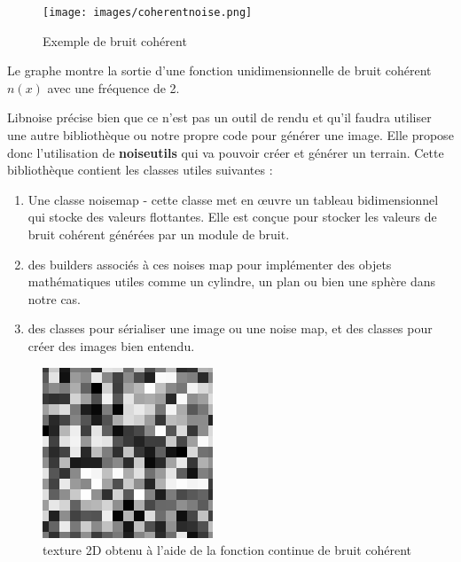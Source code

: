 \documentclass[12pt]{report}
\begin{document}
\begin{figure}
    \begin{center}
    \texttt{[image: images/coherentnoise.png]}
    \caption{Exemple de bruit cohérent}
    \end{center}
\end{figure}

Le graphe montre la sortie d'une fonction unidimensionnelle de bruit cohérent $n(x)$ avec une fréquence de 2.
 
    Libnoise précise bien que ce n'est pas un outil de rendu et qu'il faudra utiliser une autre bibliothèque ou notre propre code pour générer une image. Elle propose donc l'utilisation de \textbf{noiseutils} qui va pouvoir créer et générer un terrain. Cette bibliothèque contient les classes utiles suivantes : 
    \begin{enumerate}
    \item Une classe noisemap - cette classe met en œuvre un tableau bidimensionnel qui stocke des valeurs flottantes. Elle est conçue pour stocker les valeurs de bruit cohérent générées par un module de bruit.
    
   \item des builders associés à ces noises map pour implémenter des objets mathématiques utiles comme un cylindre, un plan ou bien une sphère dans notre cas. 
   
   \item des classes pour sérialiser une image ou une noise map, et des classes pour créer des images bien entendu.\\
    \end{enumerate}

    
    \begin{figure}[h]
        \begin{center}
        \includegraphics[scale = 0.5]{images/continuousintnoise2d.png}
        \caption{texture 2D obtenu à l'aide de la fonction continue de bruit cohérent}
        \end{center}
    \end{figure}
    
\end{document}
